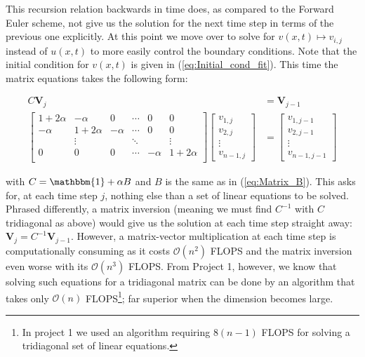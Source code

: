 \documentclass[a4paper, 11pt, notitlepage,english]{article}
\newcommand{\id}{\mathbbm{1}}
\begin{document}
This recursion relation backwards in time does, as compared to the Forward Euler scheme, not give us the solution for the next time step in terms of the previous one explicitly. At this point we move over to solve for $v(x,t) \mapsto v_{i,j}$ instead of $u(x,t)$ to more easily control the boundary conditions. Note that the initial condition for $v(x,t)$ is given in (\ref{eq:Initial_cond_fit}). This time the matrix equations takes the following form:

\begin{align}
C \boldsymbol{V}_j &= \boldsymbol{V}_{j-1} \\
\begin{bmatrix}
 1+2\alpha & -\alpha & 0 & \cdots & 0 & 0 \\
 -\alpha & 1+2\alpha & -\alpha & \cdots & 0 & 0 \\
  & \vdots & & \ddots & & \vdots \\
 0 & 0 & 0 & \cdots & -\alpha & 1+2\alpha \\
\end{bmatrix}
\begin{bmatrix}
v_{1,j} \\ v_{2,j} \\ \vdots \\ v_{n-1,j}
\end{bmatrix}
&=
\begin{bmatrix}
v_{1,j-1} \\ v_{2,j-1} \\ \vdots \\ v_{n-1,j-1}
\end{bmatrix}
\label{eq:Backwards_Euler_matrix}
\end{align}

with $C = \id + \alpha B$ and $B$ is the same as in (\ref{eq:Matrix_B}). This asks for, at each time step $j$, nothing else than a set of linear equations to be solved. Phrased differently, a matrix inversion (meaning we must find $C^{-1}$ with $C$ tridiagonal as above) would give us the solution at each time step straight away: $\boldsymbol{V}_j = C^{-1} \boldsymbol{V}_{j-1}$. However, a matrix-vector multiplication at each time step is computationally consuming as it costs $\mathcal{O}(n^2)$ FLOPS and the matrix inversion even worse with its $\mathcal{O}(n^3)$ FLOPS. From Project 1, however, we know that solving such equations for a tridiagonal matrix can be done by an algorithm that takes only $\mathcal{O}(n)$ FLOPS\footnote{In project 1 we used an algorithm requiring $8(n-1)$ FLOPS for solving a tridiagonal set of linear equations.}; far superior when the dimension becomes large. \\
\end{document}
